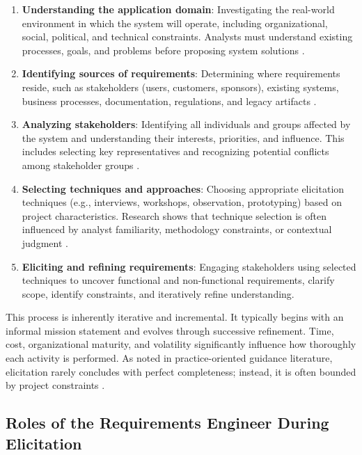 \begin{enumerate}
    \item \textbf{Understanding the application domain}: Investigating the real-world environment in which the system will operate, including organizational, social, political, and technical constraints. Analysts must understand existing processes, goals, and problems before proposing system solutions \cite{Jackson1995}.
    \item \textbf{Identifying sources of requirements}: Determining where requirements reside, such as stakeholders (users, customers, sponsors), existing systems, business processes, documentation, regulations, and legacy artifacts \cite{Loucopoulos1995}.

    \item \textbf{Analyzing stakeholders}: Identifying all individuals and groups affected by the system and understanding their interests, priorities, and influence. This includes selecting key representatives and recognizing potential conflicts among stakeholder groups \cite{Alexander2002}.

    \item \textbf{Selecting techniques and approaches}: Choosing appropriate elicitation techniques (e.g., interviews, workshops, observation, prototyping) based on project characteristics. Research shows that technique selection is often influenced by analyst familiarity, methodology constraints, or contextual judgment \cite{Hickey2003}.

    \item \textbf{Eliciting and refining requirements}: Engaging stakeholders using selected techniques to uncover functional and non-functional requirements, clarify scope, identify constraints, and iteratively refine understanding.
\end{enumerate}

This process is inherently iterative and incremental. It typically begins with an informal mission statement and evolves through successive refinement. Time, cost, organizational maturity, and volatility significantly influence how thoroughly each activity is performed. As noted in practice-oriented guidance literature, elicitation rarely concludes with perfect completeness; instead, it is often bounded by project constraints \cite{Sommerville1997}.

\subsection{Roles of the Requirements Engineer During Elicitation}

